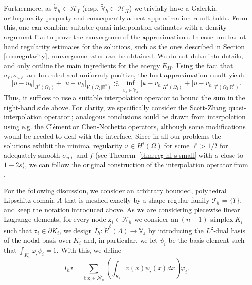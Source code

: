 \documentclass{amsart}
\newcommand{\domain}{\Lambda}
\newcommand{\Ol}{\Omega_{1}}%
\newcommand{\Onl}{\Omega_{2}}%
\renewcommand{\sl}{{\sigma_\ell}}
\newcommand{\snl}{{\sigma_{n\ell}}}
\def\calH{\mathcal{H}}
\def\R{{\mathbb R}}
\newcommand{\x}{\texttt{x}}
\theoremstyle{plain}
\numberwithin{equation}{section}
\numberwithin{table}{section}
\numberwithin{figure}{section}
\numberwithin{theorem}{section}
\numberwithin{corollary}{section}
\numberwithin{definition}{section}
\numberwithin{lemma}{section}
\numberwithin{proposition}{section}
\numberwithin{remark}{section}
\begin{document}
Furthermore, as $\widetilde{\mathbb{V}}_h \subset  \calH_{I}$ (resp. $\widetilde{\mathbb{V}}_h \subset  \calH_{II}$) we trivially have a Galerkin orthogonality property and consequently a best approximation result holds. From this, one can combine suitable quasi-interpolation estimates with a density argument like \cite[Thm. 3.1.3]{RaviartThomas83} to prove the convergence of the approximations. In case one has at hand regularity estimates for the solutions, such as the ones described in Section \ref{sec:regularity}, convergence rates can be obtained. 
We do not delve into details, and only outline the main ingredients for the energy $E_{II}$. Using the fact that $\sl, \snl$ are bounded and uniformly positive, the best approximation result yields
\[
| u - u_h|_{H^1(\Ol)} + | u - u_h|_{V^s(\Onl | \R^n)} \lesssim \inf_{v_h \in \widetilde{\mathbb{V}_h}} | u - v_h|_{H^1(\Ol)} + | u - v_h|_{V^s(\Onl | \R^n)}.
\]
Thus, it suffices to use a suitable interpolation operator to bound the sum in the right-hand side above.
For clarity, we specifically consider the Scott-Zhang quasi-interpolation operator \cite{ScottZhang};  analogous conclusions could be drawn from interpolation using e.g. the Cl\'ement \cite{Clement} or Chen-Nochetto \cite{ChenNochetto} operators, although some modifications would be needed to deal with the interface.
Since in all our problems the solutions exhibit the minimal regularity $u \in H^\ell(\Omega)$ for some $\ell > 1/2$ for adequately smooth $\snl$ and $f$ (see Theorem~\ref{thm:reg-nl-s-small} with $\alpha$ close to $1-2s$), we can follow the original construction of the interpolation operator from \cite{ScottZhang}. 

For the following discussion, we consider an arbitrary bounded, polyhedral Lipschitz domain $\domain$ that is meshed exactly by a shape-regular family $\mathcal{T}_h = \{T\}$, and keep the notation introduced above. As we are considering piecewise linear Lagrange elements, for every node $\x_i \in \overline{\mathcal{N}_h}$ we consider an $(n-1)$-simplex $K_i$ such that $\x_i \in \partial K_i$, we design $I_h : \widetilde H^\ell(\domain) \to \widetilde{\mathbb{V}}_h$ by introducing the $L^2$-dual basis of the nodal basis over $K_i$ and, in particular, we let $\psi_i$ be the basis element such that $\int_{K_i} \varphi_i \psi_i = 1$.  With this, we define
\begin{equation} \label{eq:def-quasi-interpolation}
  I_h v = \sum_{i \colon \x_i \in \overline{\mathcal{N}_h}} \left( \int_{K_i} v(x) \psi_i(x)  dx \right) \varphi_i.
\end{equation}
 
\end{document}
